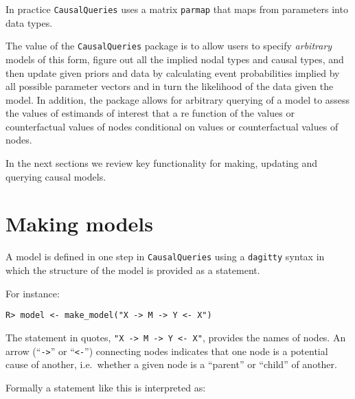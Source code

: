 \documentclass[
  11pt,
  article]{jss}
\begin{document}
In practice \texttt{CausalQueries} uses a matrix \texttt{parmap} that
maps from parameters into data types.

The value of the \texttt{CausalQueries} package is to allow users to
specify \emph{arbitrary} models of this form, figure out all the implied
nodal types and causal types, and then update given priors and data by
calculating event probabilities implied by all possible parameter
vectors and in turn the likelihood of the data given the model. In
addition, the package allows for arbitrary querying of a model to assess
the values of estimands of interest that a re function of the values or
counterfactual values of nodes conditional on values or counterfactual
values of nodes.

In the next sections we review key functionality for making, updating
and querying causal models.

\hypertarget{sec-make}{%
\section{Making models}\label{sec-make}}

A model is defined in one step in \texttt{CausalQueries} using a
\texttt{dagitty} syntax in which the structure of the model is provided
as a statement.

For instance:

\begin{verbatim}
R> model <- make_model("X -> M -> Y <- X")
\end{verbatim}

The statement in quotes,
\texttt{"X\ -\textgreater{}\ M\ -\textgreater{}\ Y\ \textless{}-\ X"},
provides the names of nodes. An arrow (``\texttt{-\textgreater{}}'' or
``\texttt{\textless{}-}'') connecting nodes indicates that one node is a
potential cause of another, i.e.~whether a given node is a ``parent'' or
``child'' of another.

Formally a statement like this is interpreted as:
\end{document}
